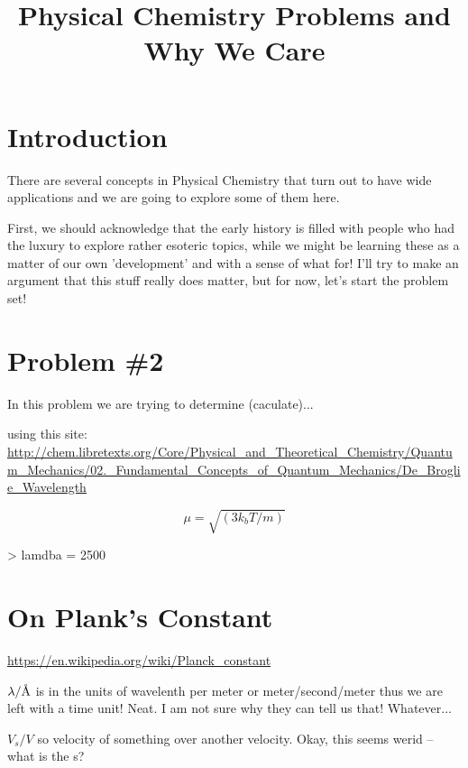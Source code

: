 \documentclass{article}
\title{Physical Chemistry Problems and Why We Care}
\newcommand{\angstrom}{\textup{\AA}}
\begin{document}

\maketitle

\section{Introduction}

There are several concepts in Physical Chemistry that turn out to have wide applications and we are going to explore some of them here. 

First, we should acknowledge that the early history is filled with people who had the luxury to explore rather esoteric topics, while we might be learning these as a matter of our own 'development' and with a sense of what for!  I'll try to make an argument that this stuff really does matter, but for now, let's start the problem set!


\section{Problem \#2}

In this problem we are trying to determine (caculate)...

using this site: \url{http://chem.libretexts.org/Core/Physical_and_Theoretical_Chemistry/Quantum_Mechanics/02._Fundamental_Concepts_of_Quantum_Mechanics/De_Broglie_Wavelength}

\begin{equation}
\mu = \sqrt{(3k_bT/m)}
\end{equation}


\begin{Schunk}
\begin{Sinput}
> lamdba = 2500
\end{Sinput}
\end{Schunk}

\section{On Plank's Constant}

\url{https://en.wikipedia.org/wiki/Planck_constant}



$\lambda/\angstrom$ is in the units of wavelenth per meter or meter/second/meter thus we are left with a time unit! Neat. I am not sure why they can tell us that!  Whatever...

$V_s/V$ so velocity of something over another velocity. Okay, this seems werid -- what is the s?
\end{document}
